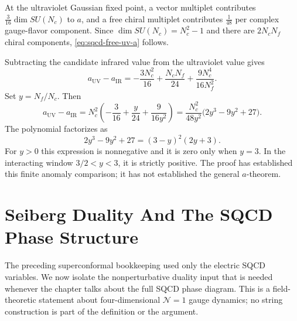 At the ultraviolet Gaussian fixed point, a vector multiplet contributes
\(\frac3{16}\dim SU(N_c)\) to \(a\), and a free chiral multiplet contributes
\(\frac1{48}\) per complex gauge-flavor component.  Since
\(\dim SU(N_c)=N_c^2-1\) and there are \(2N_cN_f\) chiral components,
\eqref{eq:sqcd-free-uv-a} follows.

Subtracting the candidate infrared value from the ultraviolet value gives
\[
  a_{\mathrm{UV}}-a_{\mathrm{IR}}
  =
  -\frac{3N_c^2}{16}
  +\frac{N_cN_f}{24}
  +\frac{9N_c^4}{16N_f^2}.
\]
Set \(y=N_f/N_c\).  Then
\[
  a_{\mathrm{UV}}-a_{\mathrm{IR}}
  =
  N_c^2
  \left(
    -\frac3{16}+\frac{y}{24}+\frac{9}{16y^2}
  \right)
  =
  \frac{N_c^2}{48y^2}\bigl(2y^3-9y^2+27\bigr).
\]
The polynomial factorizes as
\[
  2y^3-9y^2+27=(3-y)^2(2y+3).
\]
For \(y>0\) this expression is nonnegative and it is zero only when \(y=3\).
In the interacting window \(3/2<y<3\), it is strictly positive.  The proof
has established this finite anomaly comparison; it has not established the
general \(a\)-theorem.

\section{Seiberg Duality And The SQCD Phase Structure}
\label{sec:n1-seiberg-duality-sqcd}

The preceding superconformal bookkeeping used only the electric SQCD
variables.  We now isolate the nonperturbative duality input that is needed
whenever the chapter talks about the full SQCD phase diagram.  This is a
field-theoretic statement about four-dimensional \(\mathcal N=1\) gauge
dynamics; no string construction is part of the definition or the argument.

